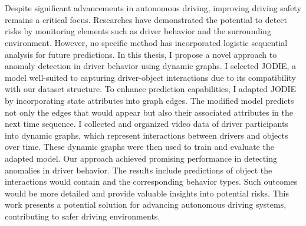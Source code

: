 \chapter{\abstractname}

Despite significant advancements in autonomous driving, improving driving safety remains a critical focus. Researches have demonstrated the potential to detect risks by monitoring elements such as driver behavior and the surrounding environment. However, no specific method has incorporated logistic sequential analysis for future predictions. In this thesis, I propose a novel approach to anomaly detection in driver behavior using dynamic graphs. I selected JODIE, a model well-suited to capturing driver-object interactions due to its compatibility with our dataset structure. To enhance prediction capabilities, I adapted JODIE by incorporating state attributes into graph edges. The modified model predicts not only the edges that would appear but also their associated attributes in the next time sequence. I collected and organized video data of driver participants into dynamic graphs, which represent interactions between drivers and objects over time. These dynamic graphs were then used to train and evaluate the adapted model. Our approach achieved promising performance in detecting anomalies in driver behavior. The results include predictions of object the interactions would contain and the corresponding behavior types. Such outcomes would be more detailed and provide valuable insights into potential risks. This work presents a potential solution for advancing autonomous driving systems, contributing to safer driving environments.



\makeatletter
{}
{\renewcommand{\abstractname}{Kurzfassung}}
{\renewcommand{\abstractname}{Abstract}}
\makeatother

\chapter{\abstractname}

